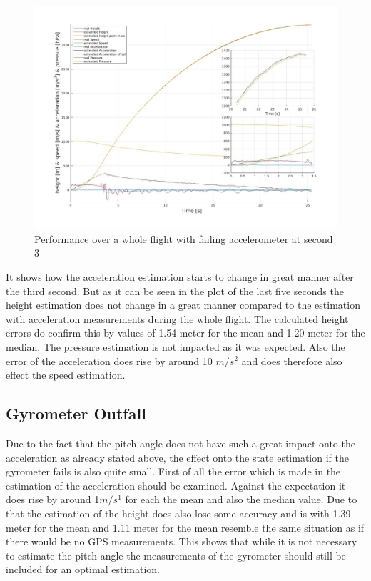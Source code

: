 \begin{figure}[h!]
 \centering
 \includegraphics[width=.8\textwidth]{./Pictures/BestSystemPerformanceAccOutfall.jpg}
 \caption{Performance over a whole flight with failing accelerometer at second 3}
 \label{fig:PerformanceAccOutfall}
\end{figure}

It shows how the acceleration estimation starts to change in great manner after the third second.
But as it can be seen in the plot of the last five seconds the height estimation does not change in a great manner
compared to the estimation with acceleration measurements during the whole flight.
The calculated height errors do confirm this by values of 1.54 meter for the mean and 1.20 meter for the median.
The pressure estimation is not impacted as it was expected.
Also the error of the acceleration does rise by around 10 $m/s^2$ and does therefore also effect the speed estimation.

\subsection{Gyrometer Outfall}
Due to the fact that the pitch angle does not have such a great impact onto the acceleration as already stated above,
the effect onto the state estimation if the gyrometer fails is also quite small.
First of all the error which is made in the estimation of the acceleration should be examined.
Against the expectation it does rise by around 1$m/s^1$ for each the mean and also the median value.
Due to that the estimation of the height does also lose some accuracy and is with 1.39 meter for the mean
and 1.11 meter for the mean resemble the same situation as if there would be no GPS measurements.
This shows that while it is not necessary to estimate the pitch angle the measurements of the gyrometer should still be included for an optimal estimation.

